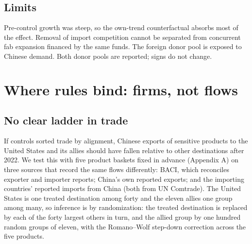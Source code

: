 \documentclass[12pt]{article}
\begin{document}
\subsection{Limits}

Pre-control growth was steep, so the own-trend counterfactual absorbs most of the effect. Removal of import competition cannot be separated from concurrent fab expansion financed by the same funds. The foreign donor pool is exposed to Chinese demand. Both donor pools are reported; signs do not change.

\FloatBarrier{}
\section{Where rules bind: firms, not flows}

\subsection{No clear ladder in trade}

If controls sorted trade by alignment, Chinese exports of sensitive products to the United States and its allies should have fallen relative to other destinations after 2022. We test this with five product baskets fixed in advance (Appendix A) on three sources that record the same flows differently: BACI, which reconciles exporter and importer reports; China's own reported exports; and the importing countries' reported imports from China (both from UN Comtrade). The United States is one treated destination among forty and the eleven allies one group among many, so inference is by randomization: the treated destination is replaced by each of the forty largest others in turn, and the allied group by one hundred random groups of eleven, with the Romano--Wolf step-down correction across the five products.
\end{document}
